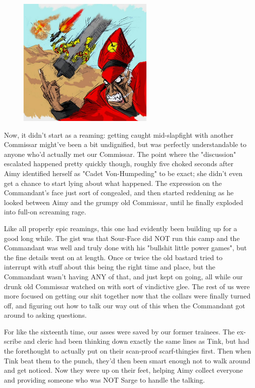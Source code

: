 \begin{figure}
	\begin{center}
		\includegraphics[width=\figwidth]{pics/21/56.png}
	\end{center}
\end{figure}
Now, it didn't start as a reaming: 
getting caught mid-slapfight with another Commissar might've been a bit undignified, but was perfectly understandable to anyone who'd actually met our Commissar. 
The point where the "discussion" escalated happened pretty quickly though, roughly five choked seconds after Aimy identified herself as "Cadet Von-Humpeding" to be exact; 
she didn't even get a chance to start lying about what happened. 
The expression on the Commandant's face just sort of congealed, and then started reddening as he looked between Aimy and the grumpy old Commissar, until he finally exploded into full-on screaming rage.

Like all properly epic reamings, this one had evidently been building up for a good long while. 
The gist was that Sour-Face did NOT run this camp and the Commandant was well and truly done with his "bullshit little power games", but the fine details went on at length. 
Once or twice the old bastard tried to interrupt with stuff about this being the right time and place, but the Commandant wasn't having ANY of that, and just kept on going, all while our drunk old Commissar watched on with sort of vindictive glee. 
The rest of us were more focused on getting our shit together now that the collars were finally turned off, and figuring out how to talk our way out of this when the Commandant got around to asking questions.

For like the sixteenth time, our asses were saved by our former trainees. 
The ex-scribe and cleric had been thinking down exactly the same lines as Tink, but had the forethought to actually put on their scan-proof scarf-thingies first. 
Then when Tink beat them to the punch, they'd then been smart enough not to walk around and get noticed. 
Now they were up on their feet, helping Aimy collect everyone and providing someone who was NOT Sarge to handle the talking.

